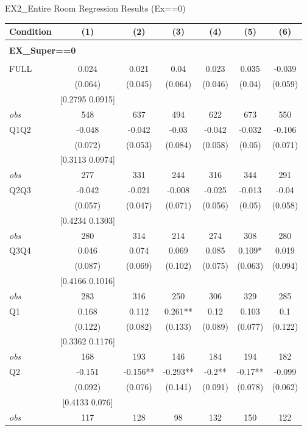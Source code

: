 \begin{table}[]
\TABLE
{EX2_Entire Room Regression Results (Ex==0) \label{ex2_result_detail2}}{\begin{tabular}{lcccccc}
\hline
Condition & (1) & (2) & (3) & (4) & (5) & (6) \\ \hline
\\ 
\multicolumn{5}{l}{\textbf{EX\_Super==0}} \\ 
\\ 
FULL & 0.024 & 0.021 & 0.04 & 0.023 & 0.035 & -0.039 \\ 
&(0.064)&(0.045) & (0.064)&(0.046)&(0.04)&(0.059)\\ 
& [0.2795 0.0915] & & & & & \\ 
\textit{obs} & 548 & 637 & 494 & 622 & 673 & 550 \\ 
Q1Q2 & -0.048 & -0.042 & -0.03 & -0.042 & -0.032 & -0.106 \\ 
&(0.072)&(0.053) & (0.084)&(0.058)&(0.05)&(0.071)\\ 
& [0.3113 0.0974] & & & & & \\ 
\textit{obs} & 277 & 331 & 244 & 316 & 344 & 291 \\ 
Q2Q3 & -0.042 & -0.021 & -0.008 & -0.025 & -0.013 & -0.04 \\ 
&(0.057)&(0.047) & (0.071)&(0.056)&(0.05)&(0.058)\\ 
& [0.4234 0.1303] & & & & & \\ 
\textit{obs} & 280 & 314 & 214 & 274 & 308 & 280 \\ 
Q3Q4 & 0.046 & 0.074 & 0.069 & 0.085 & 0.109* & 0.019 \\ 
&(0.087)&(0.069) & (0.102)&(0.075)&(0.063)&(0.094)\\ 
& [0.4166 0.1016] & & & & & \\ 
\textit{obs} & 283 & 316 & 250 & 306 & 329 & 285 \\ 
Q1 & 0.168 & 0.112 & 0.261** & 0.12 & 0.103 & 0.1 \\ 
&(0.122)&(0.082) & (0.133)&(0.089)&(0.077)&(0.122)\\ 
& [0.3362 0.1176] & & & & & \\ 
\textit{obs} & 168 & 193 & 146 & 184 & 194 & 182 \\ 
Q2 & -0.151 & -0.156** & -0.293** & -0.2** & -0.17** & -0.099 \\ 
&(0.092)&(0.076) & (0.141)&(0.091)&(0.078)&(0.062)\\ 
& [0.4133 0.076] & & & & & \\ 
\textit{obs} & 117 & 128 & 98 & 132 & 150 & 122 \\ 

\end{tabular}}
\end{table}
